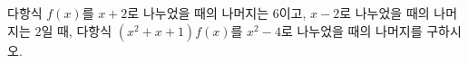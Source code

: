 다항식 $f(x)$를 $x+2$로 나누었을 때의 나머지는 $6$이고, $x-2$로 나누었을 때의 나머지는 $2$일 때, 다항식 $(x^2+x+1)f(x)$를 $x^2-4$로 나누었을 때의 나머지를 구하시오.
